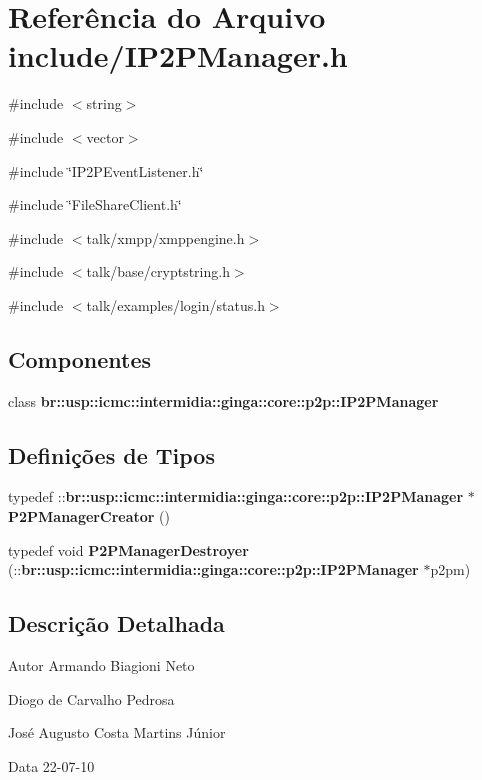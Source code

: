 \section{Referência do Arquivo include/IP2PManager.h}
\label{IP2PManager_8h}
{\ttfamily \#include $<$string$>$}\par
{\ttfamily \#include $<$vector$>$}\par
{\ttfamily \#include \char`\"{}IP2PEventListener.h\char`\"{}}\par
{\ttfamily \#include \char`\"{}FileShareClient.h\char`\"{}}\par
{\ttfamily \#include $<$talk/xmpp/xmppengine.h$>$}\par
{\ttfamily \#include $<$talk/base/cryptstring.h$>$}\par
{\ttfamily \#include $<$talk/examples/login/status.h$>$}\par
\subsection*{Componentes}
\begin{DoxyCompactItemize}
\item 
class {\bf br::usp::icmc::intermidia::ginga::core::p2p::IP2PManager}
\end{DoxyCompactItemize}
\subsection*{Definições de Tipos}
\begin{DoxyCompactItemize}
\item 
typedef ::{\bf br::usp::icmc::intermidia::ginga::core::p2p::IP2PManager} $\ast$ {\bfseries P2PManagerCreator} ()\label{IP2PManager_8h_a3d13293c17e42bf55a6adbfedf0b06db}

\item 
typedef void {\bfseries P2PManagerDestroyer} (::{\bf br::usp::icmc::intermidia::ginga::core::p2p::IP2PManager} $\ast$p2pm)\label{IP2PManager_8h_a75b487fd5102260fea0b5fe78c726688}

\end{DoxyCompactItemize}


\subsection{Descrição Detalhada}
\begin{DoxyAuthor}{Autor}
Armando Biagioni Neto 

Diogo de Carvalho Pedrosa 

José Augusto Costa Martins Júnior 
\end{DoxyAuthor}
\begin{DoxyDate}{Data}
22-\/07-\/10 
\end{DoxyDate}
